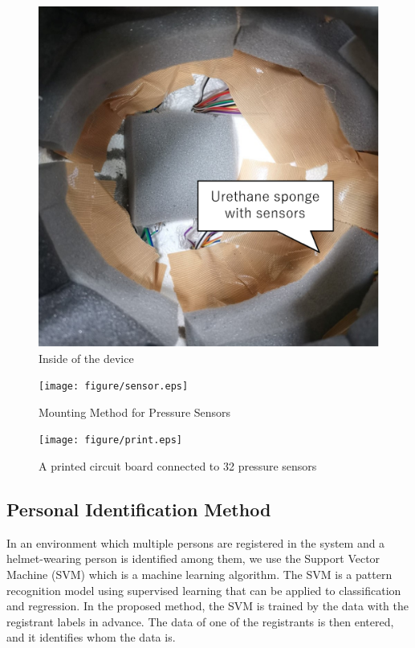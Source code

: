 \documentclass[sigchi,authordraft]{acmart}
\begin{document}
\begin{figure}[!t]
  \begin{center}
    \includegraphics[width=0.6\linewidth]{figure/met_in.eps}
  \end{center}
  \caption{Inside of the device}
  \label{fig:met_in}
\end{figure}

\begin{figure}[!t]
  \begin{center}
    \texttt{[image: figure/sensor.eps]}
  \end{center}
  \caption{Mounting Method for Pressure Sensors}
  \label{fig:sensor}
\end{figure}

\begin{figure}[!t]
  \begin{center}
    \texttt{[image: figure/print.eps]}
  \end{center}
  \caption{A printed circuit board connected to 32 pressure sensors}
  \label{fig:print}
\end{figure}


\subsection{Personal Identification Method}
In an environment which multiple persons are registered in the system and a helmet-wearing person is identified among them, we use the Support Vector Machine (SVM) which is a machine learning algorithm. The SVM is a pattern recognition model using supervised learning that can be applied to classification and regression. In the proposed method, the SVM is trained by the data with the registrant labels in advance. The data of one of the registrants is then entered, and it identifies whom the data is.\par
\end{document}
